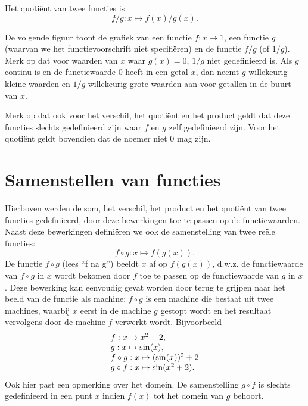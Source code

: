 \documentclass{ximera}
\begin{document}
Het quoti\"ent van twee functies is
\[
f/g:x\mapsto f(x)/g(x).
\]

\newpage



De volgende figuur toont de grafiek van een functie $f:x\mapsto 1$,
een functie $g$ (waarvan we het functievoorschrift niet specifi\"eren) en de functie $f/g$ (of $1/g$). Merk op dat voor
waarden van $x$ waar $g(x)=0$, $1/g$ niet gedefinieerd is. Als $g$
continu is en de functiewaarde $0$ heeft in een getal $x$, dan neemt $g$
willekeurig kleine waarden en $1/g$ willekeurig grote waarden aan voor
getallen in de buurt van $x$.

\begin{center}
\end{center}

Merk op dat ook voor het verschil, het quoti\"ent en het product geldt
dat deze functies slechts gedefinieerd zijn waar $f$ en $g$ zelf
gedefinieerd zijn. Voor het quoti\"ent geldt bovendien dat de noemer
niet $0$ mag zijn.


\section{Samenstellen van functies}
\label{secsam}

Hierboven werden de som, het verschil, het product en het quoti\"ent van
twee functies gedefinieerd, door deze bewerkingen toe te passen op de
functiewaarden. Naast deze bewerkingen defini\"eren we ook de
samenstelling van twee re\"ele functies:
\[
f\circ g:x\mapsto f(g(x)).
\]
De functie $f\circ g$ (lees ``f na g'') beeldt $x$ af
op $f(g(x))$, d.w.z. de functiewaarde van $f\circ g$ in $x$ wordt
bekomen door $f$ toe te passen op de functiewaarde van $g$ in $x$.
Deze bewerking kan eenvoudig gevat worden door terug te grijpen
naar het beeld van de functie als machine: $f\circ g$ is een machine
die bestaat uit twee machines, waarbij $x$ eerst in de machine $g$
gestopt wordt en het resultaat vervolgens door de machine $f$ verwerkt
wordt. Bijvoorbeeld
\[
\ba{l}
f:x\mapsto x^2+2,\\
g:x\mapsto \sin(x),\\
f\circ g:x\mapsto (\sin(x))^2+2\\
g\circ f:x\mapsto \sin(x^2+2).
\ea
\]
Ook hier past een opmerking over het domein. De samenstelling $g\circ
f$ is slechts gedefinieerd in een punt $x$ indien $f(x)$ tot het
domein van $g$ behoort.
\end{document}
